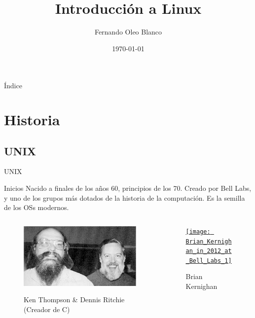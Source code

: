 \documentclass[12pt]{beamer}
\begin{document}
	\author{Fernando Oleo Blanco}
	\title{Introducción a Linux}
	\date{\today}
\begin{frame}
	\maketitle
\end{frame}

\begin{frame}{Índice}
	\tableofcontents
\end{frame}

\section{Historia}

\subsection{UNIX}
\begin{frame}{UNIX}
	\begin{block}{Inicios}
		Nacido a finales de los años 60, principios de los 70. Creado por Bell Labs, y uno de los grupos más dotados de la historia de la computación. Es la semilla de los OSs modernos.
	\end{block}
	\begin{columns}
		\begin{column}{0.5\textwidth}
			\begin{figure}
				\centering
				\href{http://cat-v.org/}{\includegraphics[width=\linewidth]{Ken-Thompson-og-Dennis-Ritchie}}
				\caption{Ken Thompson \& Dennis Ritchie (Creador de C)}
				\label{fig:ken-thompson-og-dennis-ritchie}
			\end{figure}
		\end{column}
		\begin{column}{0.5\textwidth}
			\begin{figure}
				\centering
				\href{https://www.youtube.com/watch?v=QFK6RG47bww&list=PLzH6n4zXuckqZ90zLyy36qjO5YIn1RulG}{\texttt{[image: Brian\_Kernighan\_in\_2012\_at\_Bell\_Labs\_1]}}
				\caption{Brian Kernighan}
				\label{fig:briankernighanin2012atbelllabs1}
			\end{figure}
		\end{column}
	\end{columns}
	
\end{frame}
\end{document}
